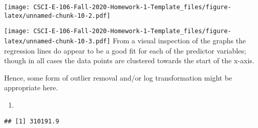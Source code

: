 \documentclass[
]{article}
\newenvironment{Shaded}{\begin{snugshade}}{\end{snugshade}}
\newcommand{\DataTypeTok}[1]{\textcolor[rgb]{0.13,0.29,0.53}{#1}}
\newcommand{\DecValTok}[1]{\textcolor[rgb]{0.00,0.00,0.81}{#1}}
\newcommand{\KeywordTok}[1]{\textcolor[rgb]{0.13,0.29,0.53}{\textbf{#1}}}
\newcommand{\NormalTok}[1]{#1}
\newcommand{\OperatorTok}[1]{\textcolor[rgb]{0.81,0.36,0.00}{\textbf{#1}}}
\newcommand{\StringTok}[1]{\textcolor[rgb]{0.31,0.60,0.02}{#1}}
\begin{document}
\texttt{[image: CSCI-E-106-Fall-2020-Homework-1-Template\_files/figure-latex/unnamed-chunk-10-2.pdf]}

\begin{Shaded}
\end{Shaded}

\texttt{[image: CSCI-E-106-Fall-2020-Homework-1-Template\_files/figure-latex/unnamed-chunk-10-3.pdf]}
From a visual inspection of the graphs the regression lines do appear to
be a good fit for each of the predictor variables; though in all cases
the data points are clustered towards the start of the x-axis.

Hence, some form of outlier removal and/or log transformation might be
appropriate here.

\begin{enumerate}
\def\labelenumi{\alph{enumi})}
\setcounter{enumi}{2}
\item
\end{enumerate}

\begin{Shaded}
\end{Shaded}

\begin{verbatim}
## [1] 310191.9
\end{verbatim}

\begin{Shaded}
\end{Shaded}
\end{document}
